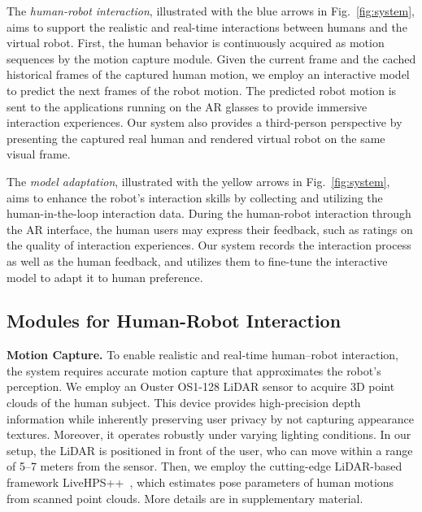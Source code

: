 The \emph{human-robot interaction}, illustrated with the blue arrows in Fig.~\ref{fig:system}, aims to support the realistic and real-time interactions between humans and the virtual robot. First, the human behavior is continuously acquired as motion sequences by the motion capture module. Given the current frame and the cached historical frames of the captured human motion, we employ an interactive model to predict the next frames of the robot motion. The predicted robot motion is sent %
to the applications running on the AR glasses to provide immersive interaction experiences. Our system also provides a third-person perspective by presenting the captured real human and rendered virtual robot on the same visual frame.

The \emph{model adaptation}, illustrated with the yellow arrows in Fig.~\ref{fig:system}, aims to enhance the robot's interaction skills by collecting and utilizing the human-in-the-loop interaction data. During the human-robot interaction through the AR interface, the human users may express their feedback, such as ratings on the quality of interaction experiences. Our system records the interaction process as well as the human feedback, and utilizes them to fine-tune the interactive model to adapt it to human preference. %

\subsection{Modules for Human-Robot Interaction}
\label{sec:mocap}

\noindent\textbf{Motion Capture.} To enable realistic and real-time human–robot interaction, the system requires accurate motion capture that approximates the robot’s perception. We employ an Ouster OS1-128 LiDAR sensor to acquire 3D point clouds of the human subject. This device provides high-precision depth information while inherently preserving user privacy by not capturing appearance textures. Moreover, it operates robustly under varying lighting conditions. In our setup, the LiDAR is positioned in front of the user, who can move within a range of 5–7 meters from the sensor.
Then, we employ the cutting-edge LiDAR-based framework LiveHPS++~\cite{ren2025livehps++}, which estimates pose parameters of human motions from scanned point clouds. More details are in supplementary material. %

